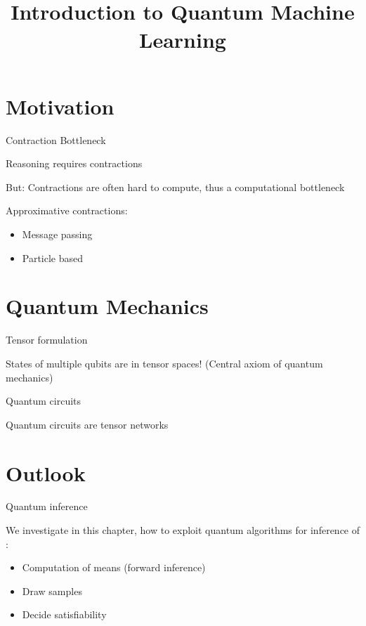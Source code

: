 \documentclass{beamer}
\title[Introduction to Quantum Machine Learning]{
    \coursechapterfour \\
    {\huge Introduction to Quantum Machine Learning}
}
\begin{document}
{\frame[plain]{\titlepage}}

    \showoutlineatsection

    \section{Motivation}

    \begin{frame}{Contraction Bottleneck}

        Reasoning requires contractions

        But: Contractions are often hard to compute, thus a computational bottleneck

        Approximative contractions:
        \begin{itemize}
            \item Message passing
            \item Particle based
        \end{itemize}

    \end{frame}

    \section{Quantum Mechanics}

    \begin{frame}{Tensor formulation}

        States of multiple qubits are in tensor spaces! (Central axiom of quantum mechanics)

    \end{frame}

    \begin{frame}{Quantum circuits}

        Quantum circuits are tensor networks

    \end{frame}

    \section{Outlook}

    \begin{frame}{Quantum inference}

        We investigate in this chapter, how to exploit quantum algorithms for inference of \ComputationActivationNetworks{}:
        \begin{itemize}
            \item Computation of means (forward inference)
            \item Draw samples
            \item Decide satisfiability
        \end{itemize}

    \end{frame}
\end{document}
